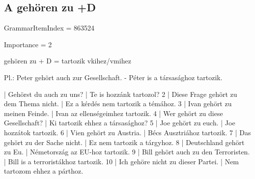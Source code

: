 \documentclass{article}
\newenvironment{desc}{\verbatim}{\endverbatim}
\newenvironment{exmp}{\verbatim}{\endverbatim}
\begin{document}
\subsection{A gehören zu +D }

GrammarItemIndex = 863524

Importance = 2

\begin{desc}
gehören zu + D = tartozik vkihez/vmihez

Pl.: Peter gehört auch zur Gesellschaft. - Péter is a társasághoz tartozik.
\end{desc}

\begin{exmp}
1 | Gehörst du auch zu uns? | Te is hozzánk tartozol?
2 | Diese Frage gehört zu dem Thema nicht. | Ez a kérdés nem tartozik a témához.
3 | Ivan gehört zu meinen Feinde. | Ivan az ellenségeimhez tartozik.
4 | Wer gehört zu diese Gesellschaft? | Ki tartozik ehhez a társasághoz?
5 | Joe gehört zu euch. | Joe hozzátok tartozik.
6 | Vien gehört zu Austria. | Bécs Ausztriához tartozik.
7 | Das gehört zu der Sache nicht. | Ez nem tartozik a tárgyhoz.
8 | Deutschland gehört zu Eu. | Németország az EU-hoz tartozik.
9 | Bill gehört auch zu den Terroristen. | Bill is a terroristákhoz tartozik.
10 | Ich gehöre nicht zu dieser Partei. | Nem tartozom ehhez a párthoz.
\end{exmp}
\end{document}
